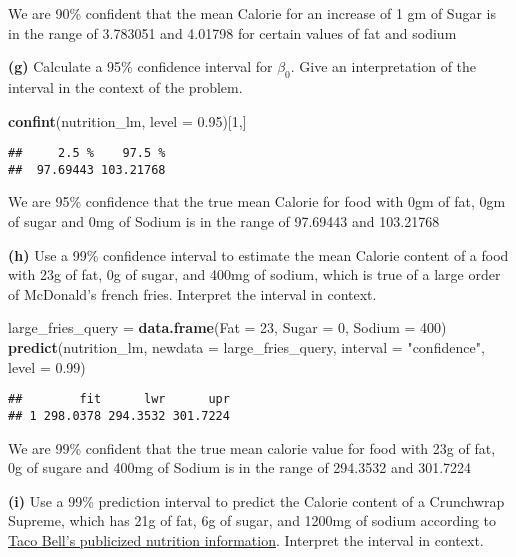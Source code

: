 \documentclass[
]{article}
\newenvironment{Shaded}{\begin{snugshade}}{\end{snugshade}}
\newcommand{\DataTypeTok}[1]{\textcolor[rgb]{0.13,0.29,0.53}{#1}}
\newcommand{\DecValTok}[1]{\textcolor[rgb]{0.00,0.00,0.81}{#1}}
\newcommand{\FloatTok}[1]{\textcolor[rgb]{0.00,0.00,0.81}{#1}}
\newcommand{\KeywordTok}[1]{\textcolor[rgb]{0.13,0.29,0.53}{\textbf{#1}}}
\newcommand{\NormalTok}[1]{#1}
\newcommand{\StringTok}[1]{\textcolor[rgb]{0.31,0.60,0.02}{#1}}
\begin{document}
We are 90\% confident that the mean Calorie for an increase of 1 gm of
Sugar is in the range of 3.783051 and 4.01798 for certain values of fat
and sodium

\textbf{(g)} Calculate a 95\% confidence interval for \(\beta_0\). Give
an interpretation of the interval in the context of the problem.

\begin{Shaded}
\begin{Highlighting}[]
\KeywordTok{confint}\NormalTok{(nutrition_lm, }\DataTypeTok{level =} \FloatTok{0.95}\NormalTok{)[}\DecValTok{1}\NormalTok{,]}
\end{Highlighting}
\end{Shaded}

\begin{verbatim}
##     2.5 %    97.5 % 
##  97.69443 103.21768
\end{verbatim}

We are 95\% confidence that the true mean Calorie for food with 0gm of
fat, 0gm of sugar and 0mg of Sodium is in the range of 97.69443 and
103.21768

\textbf{(h)} Use a 99\% confidence interval to estimate the mean Calorie
content of a food with 23g of fat, 0g of sugar, and 400mg of sodium,
which is true of a large order of McDonald's french fries. Interpret the
interval in context.

\begin{Shaded}
\begin{Highlighting}[]
\NormalTok{large_fries_query =}\StringTok{ }\KeywordTok{data.frame}\NormalTok{(}\DataTypeTok{Fat =} \DecValTok{23}\NormalTok{, }\DataTypeTok{Sugar =} \DecValTok{0}\NormalTok{, }\DataTypeTok{Sodium =} \DecValTok{400}\NormalTok{)}
\KeywordTok{predict}\NormalTok{(nutrition_lm, }\DataTypeTok{newdata =}\NormalTok{ large_fries_query, }\DataTypeTok{interval =} \StringTok{"confidence"}\NormalTok{, }\DataTypeTok{level =} \FloatTok{0.99}\NormalTok{)}
\end{Highlighting}
\end{Shaded}

\begin{verbatim}
##        fit      lwr      upr
## 1 298.0378 294.3532 301.7224
\end{verbatim}

We are 99\% confident that the true mean calorie value for food with 23g
of fat, 0g of sugare and 400mg of Sodium is in the range of 294.3532 and
301.7224

\textbf{(i)} Use a 99\% prediction interval to predict the Calorie
content of a Crunchwrap Supreme, which has 21g of fat, 6g of sugar, and
1200mg of sodium according to
\href{https://www.tacobell.com/nutrition/info}{Taco Bell's publicized
nutrition information}. Interpret the interval in context.
\end{document}
